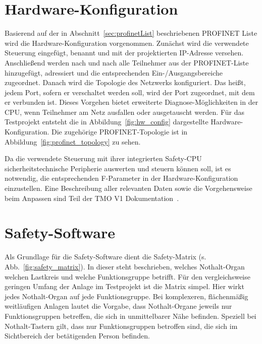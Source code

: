 \section{Hardware-Konfiguration}
\label{sec:hw_config}
Basierend auf der in Abschnitt~\ref{sec:profinetList} beschriebenen PROFINET Liste wird die Hardware-Konfiguration vorgenommen. Zunächst wird die verwendete Steuerung eingefügt, benannt und mit der projektierten IP-Adresse versehen. Anschließend werden nach und nach alle Teilnehmer aus der PROFINET-Liste hinzugefügt, adressiert und die entsprechenden Ein-/Ausgangsbereiche zugeordnet. Danach wird die Topologie des Netzwerks konfiguriert. Das heißt, jedem Port, sofern er verschaltet werden soll, wird der Port zugeordnet, mit dem er verbunden ist. Dieses Vorgehen bietet erweiterte Diagnose-Möglichkeiten in der CPU, wenn Teilnehmer am Netz ausfallen oder ausgetauscht werden. Für das Testprojekt entsteht die in Abbildung~\ref{fig:hw_config} dargestellte Hardware-Konfiguration. Die zugehörige PROFINET-Topologie ist in Abbildung~\ref{fig:profinet_topology} zu sehen.\par
Da die verwendete Steuerung mit ihrer integrierten Safety-CPU sicherheitstechnische Peripherie auswerten und steuern können soll, ist es notwendig, die entsprechenden F-Parameter in der Hardware-Konfiguration einzustellen. Eine Beschreibung aller relevanten Daten sowie die Vorgehensweise beim Anpassen sind Teil der TMO V1 Dokumentation~.





\section{Safety-Software}
\label{sec:safety_software}

Als Grundlage für die Safety-Software dient die Safety-Matrix (s. Abb.~\ref{fig:safety_matrix}). In dieser steht beschrieben, welches Nothalt-Organ welchen Lastkreis und welche Funktionsgruppe betrifft. Für den vergleichsweise geringen Umfang der Anlage im Testprojekt ist die Matrix simpel. Hier wirkt jedes Nothalt-Organ auf jede Funktionsgruppe. Bei komplexeren, flächenmäßig weitläufigen Anlagen lautet die Vorgabe, dass Nothalt-Organe jeweils nur Funktionsgruppen betreffen, die sich in unmittelbarer Nähe befinden. Speziell bei Nothalt-Tastern gilt, dass nur Funktionsgruppen betroffen sind, die sich im Sichtbereich der betätigenden Person befinden.

